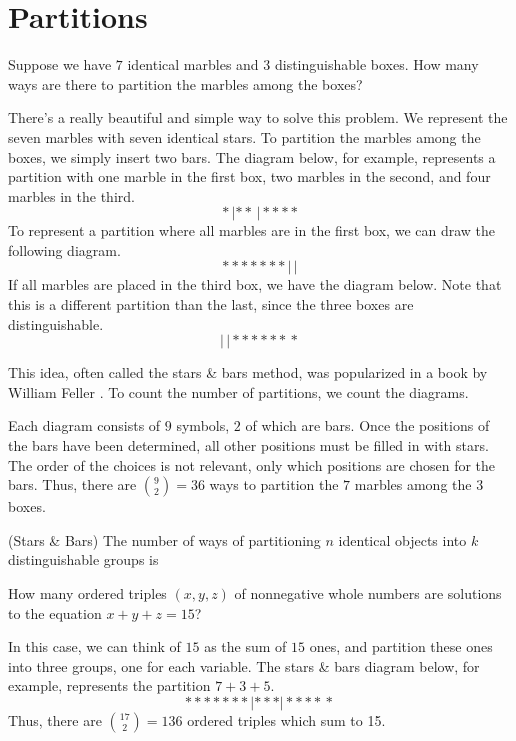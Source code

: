 {\color{red}

\section{Partitions}

Suppose we have $7$ identical marbles and $3$ distinguishable boxes. How many ways are there to partition the marbles among the boxes?
\par
There's a really beautiful and simple way to solve this problem. We represent the seven marbles with seven identical stars. To partition the marbles among the boxes, we simply insert two bars. The diagram below, for example, represents a partition with one marble in the first box, two marbles in the second, and four marbles in the third.
$$*\,|**\,|****$$
To represent a partition where all marbles are in the first box, we can draw the following diagram.
$$*******\,|\,|$$
If all marbles are placed in the third box, we have the diagram below. Note that this is a different partition than the last, since the three boxes are distinguishable.
$$|\,|******\,*$$
\par
This idea, often called the stars \& bars  method, was popularized in a book by William Feller \cite{Feller}. To count the number of partitions, we count the diagrams.
\par
Each diagram consists of $9$ symbols, $2$ of which are bars. Once the positions of the bars have been determined, all other positions must be filled in with stars. The order of the choices is not relevant, only which positions are chosen for the bars. Thus, there are $\binom{9}{2} = 36$ ways to partition the $7$ marbles among the $3$ boxes.

\begin{prop}\label{StarsAndBars} (Stars \& Bars) The number of ways of partitioning $n$ identical objects into $k$ distinguishable groups is 
\end{prop}

\begin{examp} How many ordered triples $(x,y,z)$ of nonnegative whole numbers are solutions to the equation $x+y+z=15$?
\par
\noindent In this case, we can think of $15$ as the sum of $15$ ones, and partition these ones into three groups, one for each variable. The stars \& bars diagram below, for example, represents the partition $7+3+5$.
$$*******\,|***|****\,*$$
Thus, there are $\binom{17}{2} = 136$ ordered triples which sum to 15.
\end{examp}

}
